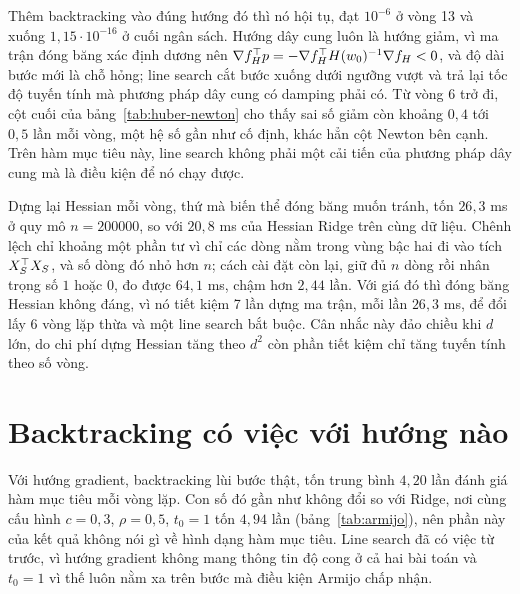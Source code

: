 \documentclass[12pt, a4paper, oneside]{report}
\theoremstyle{definition}
\begin{document}
Thêm backtracking vào đúng hướng đó thì nó hội tụ, đạt $10^{-6}$ ở vòng 13 và
xuống $1{,}15 \cdot 10^{-16}$ ở cuối ngân sách. Hướng dây cung luôn là hướng giảm,
vì ma trận đóng băng xác định dương nên
$\nabla f_{H}^{\top} p = -\nabla f_{H}^{\top} H(w_{0})^{-1} \nabla f_{H} < 0$, và độ
dài bước mới là chỗ hỏng; line search cắt bước xuống dưới ngưỡng vượt và trả lại
tốc độ tuyến tính mà phương pháp dây cung có damping phải có. Từ vòng 6 trở đi,
cột cuối của bảng~\ref{tab:huber-newton} cho thấy sai số giảm còn khoảng $0{,}4$
tới $0{,}5$ lần mỗi vòng, một hệ số gần như cố định, khác hẳn cột Newton bên cạnh.
Trên hàm mục tiêu này, line search không phải một cải tiến của phương pháp dây
cung mà là điều kiện để nó chạy được.


Dựng lại Hessian mỗi vòng, thứ mà biến thể đóng băng muốn tránh, tốn $26{,}3$ ms ở
quy mô $n = \num{200000}$, so với $20{,}8$ ms của Hessian Ridge trên cùng dữ liệu.
Chênh lệch chỉ khoảng một phần tư vì chỉ các dòng nằm trong vùng bậc hai đi vào
tích $X_{S}^{\top} X_{S}$, và số dòng đó nhỏ hơn $n$; cách cài đặt còn lại, giữ đủ
$n$ dòng rồi nhân trọng số $1$ hoặc $0$, đo được $64{,}1$ ms, chậm hơn $2{,}44$
lần. Với giá đó thì đóng băng Hessian không đáng, vì nó tiết kiệm 7 lần dựng ma
trận, mỗi lần $26{,}3$ ms, để đổi lấy 6 vòng lặp thừa và một line search bắt buộc.
Cân nhắc này đảo chiều khi $d$ lớn, do chi phí dựng Hessian tăng theo $d^{2}$ còn
phần tiết kiệm chỉ tăng tuyến tính theo số vòng.

\section{Backtracking có việc với hướng nào}

Với hướng gradient, backtracking lùi bước thật, tốn trung bình $4{,}20$ lần đánh
giá hàm mục tiêu mỗi vòng lặp. Con số đó gần như không đổi so với Ridge, nơi cùng
cấu hình $c = 0{,}3$, $\rho = 0{,}5$, $t_{0} = 1$ tốn $4{,}94$ lần
(bảng~\ref{tab:armijo}), nên phần này của kết quả không nói gì về hình dạng hàm
mục tiêu. Line search đã có việc từ trước, vì hướng gradient không mang thông tin
độ cong ở cả hai bài toán và $t_{0} = 1$ vì thế luôn nằm xa trên bước mà điều kiện
Armijo chấp nhận.
\end{document}
